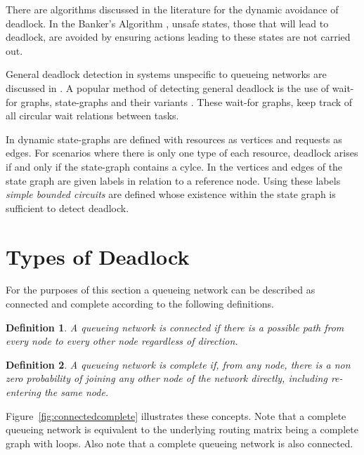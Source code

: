 \documentclass{article}
\newtheorem{definition}{Definition}
\begin{document}
There are algorithms discussed in the literature for the dynamic avoidance of deadlock.
In the Banker's Algorithm \cite{dijkstra82, kawadkaretal14}, unsafe states, those that will lead to deadlock, are avoided by ensuring actions leading to these states are not carried out.

General deadlock detection in systems unspecific to queueing networks are discussed in \cite{coffmanelphick71}.
A popular method of detecting general deadlock is the use of wait-for graphs, state-graphs and their variants \cite{cheng90, elmagarmid86, coffmanelphick71, choetal95}.
These wait-for graphs, keep track of all circular wait relations between tasks.

In \cite{coffmanelphick71} dynamic state-graphs are defined with resources as vertices and requests as edges.
For scenarios where there is only one type of each resource, deadlock arises if and only if the state-graph contains a cylce.
In \cite{choetal95} the vertices and edges of the state graph are given labels in relation to a reference node.
Using these labels \textit{simple bounded circuits} are defined whose existence within the state graph is sufficient to detect deadlock.

\section{Types of Deadlock}\label{sec:typesofdeadlock}
For the purposes of this section a queueing network can be described as connected and complete according to the following definitions.\\

\begin{definition}
A queueing network is connected if there is a possible path from every node to every other node regardless of direction.\\
\end{definition}

\begin{definition}
A queueing network is complete if, from any node, there is a non zero probability of joining any other node of the network directly, including re-entering the same node.\\
\end{definition}

Figure~\ref{fig:connectedcomplete} illustrates these concepts.
Note that a complete queueing network is equivalent to the underlying routing matrix being a complete graph with loops.
Also note that a complete queueing network is also connected.
\end{document}
